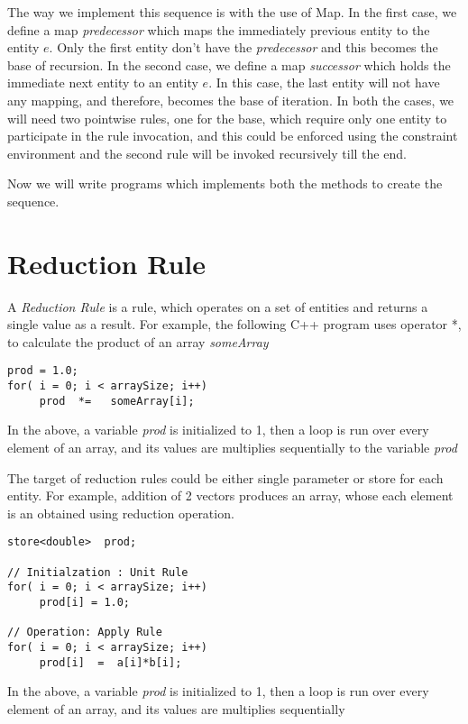 The way we implement this sequence is with the use of Map. In the first case, we define
a map {\em predecessor} which maps the immediately previous entity to the entity $e$. 
Only the first entity don't have the {\em predecessor} and this becomes the base of 
recursion.  In the second case, we define a map {\em successor } which holds the 
immediate next entity to an entity $e$. In this case, the last entity will not have
any mapping, and therefore, becomes the base of iteration. In both the cases, we will 
need two pointwise rules, one for the base, which require only one entity to participate 
in the rule invocation, and this could be enforced using the constraint environment and
the second rule will be invoked recursively till the end.

\par Now we will write programs which implements both the methods to create the sequence.

\section{ Reduction Rule }
\par A {\em Reduction Rule } is a rule, which operates on a set of entities
and returns a single value as a result. For example, the following C++
program uses operator *, to calculate the product of an array {\em someArray}
\begin{center}
\begin{verbatim}
prod = 1.0;
for( i = 0; i < arraySize; i++)
     prod  *=   someArray[i];
\end{verbatim}
\end{center}
\par In the above, a variable {\em prod }is initialized to 1, then a loop is
run over every element of an array, and its values are multiplies sequentially
to the variable {\em prod }


The target of reduction rules could be either single parameter or store for
each entity. For example, addition of 2 vectors produces an array, whose each
element is an obtained using reduction operation.
\begin{verbatim}
store<double>  prod;

// Initialzation : Unit Rule
for( i = 0; i < arraySize; i++)
     prod[i] = 1.0;

// Operation: Apply Rule
for( i = 0; i < arraySize; i++)
     prod[i]  =  a[i]*b[i];
\end{verbatim}
\par In the above, a variable {\em prod }is initialized to 1, then a loop is
run over every element of an array, and its values are multiplies sequentially

